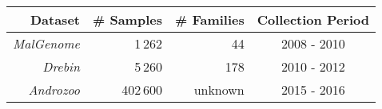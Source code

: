 \begin{tabular}{|r|r|r|c|}
    \hline
    \textbf{Dataset} & \textbf{\# Samples} & \textbf{\# Families} & \textbf{Collection Period} \\
    \hline
    {\em MalGenome} &  1\,262 & 44 & 2008 - 2010 \\
    {\em Drebin} &  5\,260   & 178 & 2010 - 2012 \\
    {\em Androzoo} & 402\,600 & unknown & 2015 - 2016 \\
    \hline
\end{tabular}
